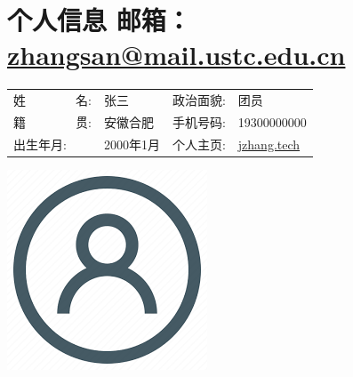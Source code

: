    \begin{figure}[h]
        \begin{minipage}{0.82\textwidth}
            \section{\makebox[\widthof{\faAddressCard}][c]{\color{USTC_Blue}{\faAddressCard}}\quad 个人信息 \quad \small 邮箱：\href{mailto:zhangsan@mail.ustc.edu.cn}{zhangsan@mail.ustc.edu.cn} }
            \begin{tabularx}{\linewidth}{p{}Xp{}X}
                姓\ \ \ \ \ \ \ \ 名: & 张三 & 
                政治面貌: & 团员  \\
                籍\ \ \ \ \ \ \ \ 贯: & 安徽合肥 & 
                手机号码: & 19300000000 \\
                出生年月: & 2000年1月 & 
                个人主页: & \href{https://jzhang.tech}{\underline{jzhang.tech}} \\
            \end{tabularx}
        \end{minipage}
    \hspace{2em}
    \begin{minipage}{0.13\textwidth}
        \setlength{\fboxsep}{0pt}
        \includegraphics[width=\linewidth]{images/avatar.png}
    \end{minipage}
    \end{figure}
    \vspace{-2.3em}

